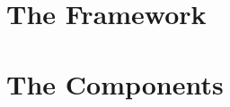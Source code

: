 \documentclass[a4paper]{book}
\begin{document}


\tableofcontents

\part{The Framework}
\label{part:simulation}



\part{The Components}
\label{part:components}







\printindex
\end{document}
